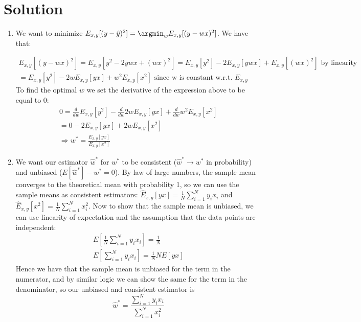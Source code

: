 \documentclass[submit]{harvardml}
\newenvironment{solution}
  {\color{magenta}\section*{Solution}}
{}
\begin{document}
\begin{solution}
\begin{enumerate}
    \item We want to minimize $E_{x,y} [(y - \hat{y})^2] = \argmin_w E_{x,y} [(y - wx)^2]$. We have that: 

    \begin{equation*}
    \begin{split}
    E_{x,y} [(y - wx)^2] = E_{x,y} [y^2 - 2ywx + (wx)^2] = E_{x,y} [y^2] - 2E_{x,y}[ywx] + E_{x,y}[(wx)^2] \text{ by linearity} \\
    = E_{x,y} [y^2] - 2wE_{x,y}[yx] + w^2E_{x,y}[x^2] \text{ since w is constant w.r.t. }E_{x,y} 
    \end{split}
    \end{equation*}
    To find the optimal $w$ we set the derivative of the expression above to be equal to 0: 
    \begin{equation*}
        \begin{split}
            0 = \frac{d}{dw}E_{x,y} [y^2] - \frac{d}{dw}2wE_{x,y}[yx] + \frac{d}{dw} w^2E_{x,y}[x^2] \\
            = 0 - 2E_{x,y}[yx] + 2wE_{x,y}[x^2] \\ 
            \Rightarrow w^* = \frac{E_{x,y}[yx]}{E_{x,y}[x^2]}
        \end{split}
    \end{equation*}
    
    \item We want our estimator $\hat{w}^*$ for $w^*$ to be consistent ($\hat{w}^* \rightarrow w^*$ in probability) and unbiased ($E[\hat{w}^*] - w^* = 0$). By law of large numbers, the sample mean converges to the theoretical mean with probability 1, so we can use the sample means as consistent estimators: $\hat{E}_{x,y}[yx] = \frac{1}{N}\sum_{i=1}^Ny_ix_i$ and $\hat{E}_{x,y}[x^2] = \frac{1}{N}\sum_{i=1}^Nx_i^2$. Now to show that the sample mean is unbiased, we can use linearity of expectation and the assumption that the data points are independent:  
    \begin{equation*}
    \begin{split}
        E\left[\frac{1}{N}\sum_{i=1}^Ny_ix_i
        \right] = \frac{1}{N} \\
        E\left[\sum_{i=1}^Ny_ix_i\right] = \frac{1}{N}N E\left[yx\right]
    \end{split}
    \end{equation*}
    Hence we have that the sample mean is unbiased for the term in the numerator, and by similar logic we can show the same for the term in the denominator, so our unbiased and consistent estimator is $$\hat{w}^* = \frac{\sum_{i=1}^Ny_ix_i}{\sum_{i=1}^Nx_i^2}$$
    

\end{enumerate}
\end{solution}
\end{document}
